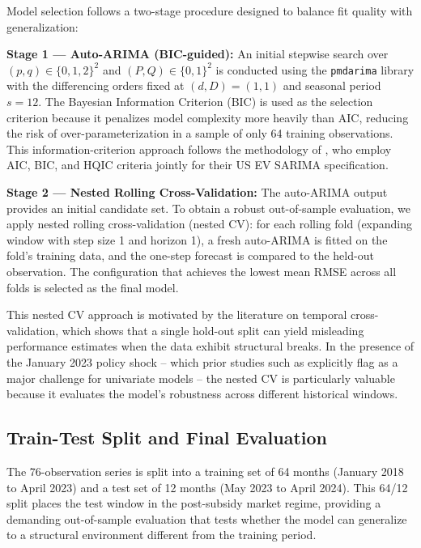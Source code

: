 \documentclass[12pt]{article}
\begin{document}
Model selection follows a two-stage procedure designed to balance fit quality with generalization:

\textbf{Stage 1 --- Auto-ARIMA (BIC-guided):} An initial stepwise search over $(p, q) \in \{0,1,2\}^2$ and $(P,Q) \in \{0,1\}^2$ is conducted using the \texttt{pmdarima} library with the differencing orders fixed at $(d,D)=(1,1)$ and seasonal period $s=12$. The Bayesian Information Criterion (BIC) is used as the selection criterion because it penalizes model complexity more heavily than AIC, reducing the risk of over-parameterization in a sample of only 64 training observations. This information-criterion approach follows the methodology of \citet{cetin2024}, who employ AIC, BIC, and HQIC criteria jointly for their US EV SARIMA specification.

\textbf{Stage 2 --- Nested Rolling Cross-Validation:} The auto-ARIMA output provides an initial candidate set. To obtain a robust out-of-sample evaluation, we apply nested rolling cross-validation (nested CV): for each rolling fold (expanding window with step size 1 and horizon 1), a fresh auto-ARIMA is fitted on the fold's training data, and the one-step forecast is compared to the held-out observation. The configuration that achieves the lowest mean RMSE across all folds is selected as the final model.

This nested CV approach is motivated by the literature on temporal cross-validation, which shows that a single hold-out split can yield misleading performance estimates when the data exhibit structural breaks. In the presence of the January 2023 policy shock -- which prior studies such as \citet{chen2025} explicitly flag as a major challenge for univariate models -- the nested CV is particularly valuable because it evaluates the model's robustness across different historical windows.

\subsection{Train-Test Split and Final Evaluation}

The 76-observation series is split into a training set of 64 months (January 2018 to April 2023) and a test set of 12 months (May 2023 to April 2024). This 64/12 split places the test window in the post-subsidy market regime, providing a demanding out-of-sample evaluation that tests whether the model can generalize to a structural environment different from the training period.
\end{document}
